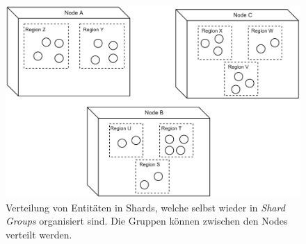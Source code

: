\begin{figure}
    \centering
    \includegraphics[width=0.8\linewidth]{gfx/implementation/Sharding}
    \caption{Verteilung von Entitäten in Shards, welche selbst wieder in \textit{Shard Groups} organisiert sind. Die Gruppen können zwischen den Nodes verteilt werden. }
    \label{fig:implementation:actorSharding}
\end{figure} 

